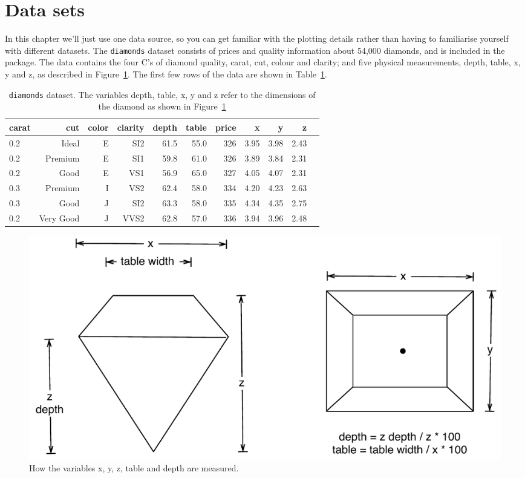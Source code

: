 \section{Data sets}\label{sec:data_sets}

In this chapter we'll just use one data source, so you can get familiar with the plotting details rather than having to familiarise yourself with different datasets. The {\tt diamonds} dataset consists of prices and quality information about 54,000 diamonds, and is included in the \ggplot package. The data contains the four C's of diamond quality, carat, cut, colour and clarity; and five physical measurements, depth, table, x, y and z, as described in Figure~\ref{fig:diamond-dim}.  The first few rows of the data are shown in Table~\ref{tab:diamonds}.

\begin{table}[ht]
\begin{center}
\begin{tabular}{lrrrrrrrrrr}
  \toprule
  carat & cut & color & clarity & depth & table & price & x & y & z \\
  \midrule
  0.2 & Ideal & E & SI2 & 61.5 & 55.0 & 326 & 3.95 & 3.98 & 2.43 \\
  0.2 & Premium & E & SI1 & 59.8 & 61.0 & 326 & 3.89 & 3.84 & 2.31 \\
  0.2 & Good & E & VS1 & 56.9 & 65.0 & 327 & 4.05 & 4.07 & 2.31 \\
  0.3 & Premium & I & VS2 & 62.4 & 58.0 & 334 & 4.20 & 4.23 & 2.63 \\
  0.3 & Good & J & SI2 & 63.3 & 58.0 & 335 & 4.34 & 4.35 & 2.75 \\
  0.2 & Very Good & J & VVS2 & 62.8 & 57.0 & 336 & 3.94 & 3.96 & 2.48 \\
  \bottomrule
\end{tabular}
\caption{{\tt diamonds} dataset.  The variables depth, table, x, y and z refer to the dimensions of the diamond as shown in Figure~\ref{fig:diamond-dim}}
\label{tab:diamonds}
\end{center}
\end{table}

\begin{figure}[htbp]
  \centering
    \includegraphics[width=0.8\linewidth]{diamond-dimensions}
  \caption{How the variables x, y, z, table and depth are measured.}
  \label{fig:diamond-dim}
\end{figure}

